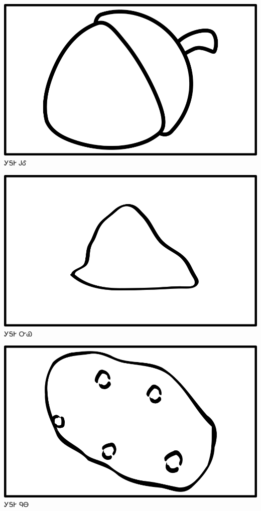 \documentclass[avery5371]{flashcards}%
\begin{document}
    \begin{flashcard}{
        \includegraphics[width=0.95\columnwidth,height=.51\columnwidth,keepaspectratio]{../artwork/objects-neutral/gule}
    }
        \Huge ᎩᎦᎨ ᎫᎴ
    \end{flashcard}

    \begin{flashcard}{
        \includegraphics[width=0.95\columnwidth,height=.51\columnwidth,keepaspectratio]{../artwork/objects-neutral/nvya}
    }
        \Huge ᎩᎦᎨ ᏅᏯ
    \end{flashcard}

    \begin{flashcard}{
        \includegraphics[width=0.95\columnwidth,height=.51\columnwidth,keepaspectratio]{../artwork/objects-neutral/nuna}
    }
        \Huge ᎩᎦᎨ ᏄᎾ
    \end{flashcard}
\end{document}
